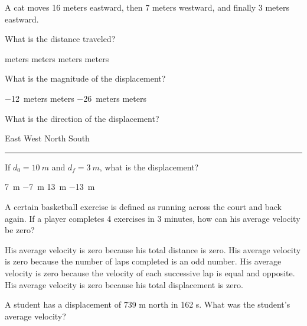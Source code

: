 \documentclass[]{exam}
\begin{document}
\begin{questions}
\begin{questions}
\begin{EnvUplevel}
A cat moves 16 meters eastward, then 7 meters westward, and finally 3 meters eastward. 
\end{EnvUplevel}



\question \label{ques:cat_start}
What is the distance traveled?

\begin{choices}
 meters
 meters
 meters
 meters
\end{choices}

\question
What is the magnitude of the displacement?

\begin{choices}
\choice \SI{-12}{meters}
 meters
\choice \SI{-26}{meters}
 meters
\end{choices}

\question \label{ques:cat_end}
What is the direction of the displacement?

\begin{choices}
\CorrectChoice East
\choice West
\choice North
\choice South
\end{choices}

\vspace{1em} \hrule

\question
If $d_0 = \SI{10}{m}$ and $d_f = \SI{3}{m}$, what is the displacement?

\begin{choices}
\choice \SI{7}{m}
\CorrectChoice \SI{-7}{m} 
\choice \SI{13}{m}
\choice \SI{-13}{m}
\end{choices}

\clearpage





\question %
A certain basketball exercise is defined as running across the court and back again. If a player completes 4 exercises in 3 minutes, how can his average velocity be zero?
\begin{choices}
\choice His average velocity is zero because his total distance is zero.
\choice His average velocity is zero because the number of laps completed is an odd number.
\choice His average velocity is zero because the velocity of each successive lap is equal and opposite.
\CorrectChoice His average velocity is zero because his total displacement is zero.
\end{choices}

\question %
A student has a displacement of 739 m north in 162 s. What was the student's average velocity?


\end{questions}
\end{questions}
\end{document}

